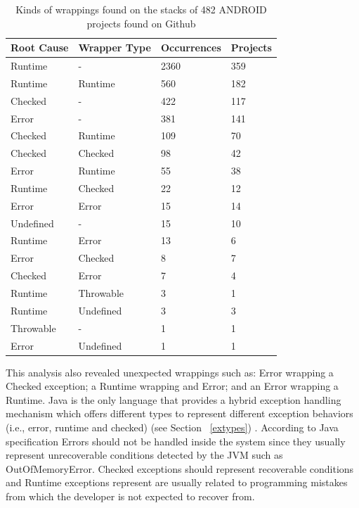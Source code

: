 \documentclass[conference]{IEEEtran}
\begin{document}
\begin{table}
\centering
\begin{tabular}{llll}
    \hline
    \bfseries{Root Cause} & \bfseries{Wrapper Type} & \bfseries{Occurrences} & \bfseries{Projects} \\
    \hline
     Runtime    & -   &  2360 & 359 \\

    Runtime   & Runtime & 560  & 182 \\
    
 Checked    &   -  & 422  & 117 \\
     Error    &   -   & 381  & 141 \\
   Checked &  Runtime   & 109  & 70  \\
    Checked   & Checked & 98   & 42  \\
   Error   &  Runtime   & 55   & 38  \\
   Runtime &  Checked   & 22   & 12  \\
    Error     & Error   & 15   & 14  \\
  Undefined    &  -  &  15   & 10  \\
   Runtime & Error     &  13   & 6 \\
  Error   & Checked   &  8    & 7 \\
    Checked &Error     &  7    & 4 \\
    Runtime &Throwable &  3    & 1 \\
   Runtime & Undefined &  3    & 3 \\
   Throwable    & -  &  1    & 1 \\
   Error   & Undefined &  1    & 1 \\
    \hline
  \end{tabular}
\caption{Kinds of wrappings found on the stacks of 482 ANDROID projects found on Github}
\label{tab:wrappingandroid}
\end{table}

This analysis also revealed unexpected wrappings such as: Error wrapping a Checked 
exception; a Runtime wrapping and Error; and an Error wrapping a Runtime.
Java is the only language that provides a hybrid exception handling mechanism
which offers  different types to represent different exception behaviors (i.e., error, 
runtime and checked) (see Section ~\ref{extypes}) . According to Java specification Errors should not be
handled inside the system since they usually represent unrecoverable conditions
detected by the JVM such as OutOfMemoryError. Checked exceptions should
represent recoverable conditions and  Runtime exceptions represent are usually
related to programming mistakes from which the developer is not expected to recover
from. 
\end{document}
